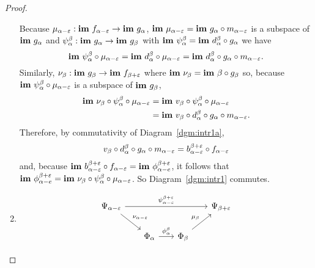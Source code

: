 \begin{proof}
\begin{enumerate}[label=\Roman*.]
    Because $\mu_{\alpha-\varepsilon} : \mathbf{im}~f_{\alpha-\varepsilon}\to\mathbf{im}~g_\alpha$, $\mathbf{im}~\mu_{\alpha-\varepsilon} = \mathbf{im}~g_\alpha\circ m_{\alpha-\varepsilon}$ is a subspace of $\mathbf{im}~g_\alpha$ and $\psi_\alpha^\beta : \mathbf{im}~g_\alpha\to \mathbf{im}~g_\beta$ with $\mathbf{im}~\psi_\alpha^\beta = \mathbf{im}~d_\alpha^\beta\circ g_\alpha$ we have
    \[ \mathbf{im}~\psi_\alpha^\beta\circ \mu_{\alpha-\varepsilon} = \mathbf{im}~d_\alpha^\beta \circ \mu_{\alpha-\varepsilon} = \mathbf{im}~d_\alpha^\beta\circ g_\alpha\circ m_{\alpha-\varepsilon}.\]
    Similarly, $\nu_\beta : \mathbf{im}~g_\beta \to \mathbf{im}~f_{\beta + \varepsilon}$ where $\mathbf{im}~\nu_\beta = \mathbf{im}~\beta\circ g_\beta$ so, because $\mathbf{im}~\psi_\alpha^\beta\circ\mu_{\alpha-\varepsilon}$ is a subspace of $\mathbf{im}~g_{\beta}$,
    \begin{align*}
      \mathbf{im}~\nu_\beta\circ\psi_\alpha^\beta\circ\mu_{\alpha-\varepsilon} &= \mathbf{im}~v_\beta\circ\psi_\alpha^\beta \circ\mu_{\alpha-\varepsilon}\\
        &= \mathbf{im}~v_\beta\circ d_\alpha^\beta\circ g_\alpha\circ m_{\alpha-\varepsilon}.
    \end{align*}
    Therefore, by commutativity of Diagram~\ref{dgm:intr1a},
    \[v_\beta\circ d_\alpha^\beta\circ g_\alpha\circ m_{\alpha-\varepsilon} = b_{\alpha-\varepsilon}^{\beta +\varepsilon}\circ f_{\alpha-\varepsilon}\]
    and, because $\mathbf{im}~b_{\alpha-\varepsilon}^{\beta +\varepsilon}\circ f_{\alpha-\varepsilon} = \mathbf{im}~\phi_{\alpha-e}^{\beta+\varepsilon}$, it follows that $\mathbf{im}~\phi_{\alpha-e}^{\beta+\varepsilon} = \mathbf{im}~\nu_\beta\circ\psi_\alpha^\beta\circ\mu_{\alpha-\varepsilon}$.
    So Diagram~\ref{dgm:intr1} commutes.

    \item \begin{equation}\label{dgm:intr1}\begin{tikzcd}[column sep=scriptsize]
      \Psi_{\alpha-\e}  \arrow[to=Fb, "\psi_{\alpha-\e}^{\beta+\e}"]
                        \arrow[to=Ga, "\nu_{\alpha-\e}"]
      & & & |[alias=Fb]|
        \Psi_{\beta+\e} \\
      & |[alias=Ga]|
      \Phi_\alpha \arrow[to=Gb, "\phi_\alpha^\beta"]
      & |[alias=Gb]|
        \Phi_\beta \arrow[to=Fb, "\mu_\beta"] &
    \end{tikzcd}\end{equation}
  \end{enumerate}
\end{proof}
